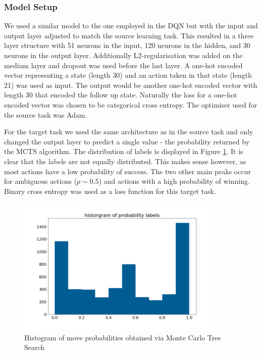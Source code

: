 \documentclass[12pt,a4paper]{article}
\begin{document}
{\subsubsection{Model Setup}
We used a similar model to the one employed in the DQN but with the input and output layer adjusted to match the source learning task. This resulted in a three layer structure with 51 neurons in the input, 120 neurons in the hidden, and 30 neurons in the output layer. Additionally L2-regularisation was added on the medium layer and dropout was used before the last layer. A one-hot encoded vector representing a state (length 30) and an action taken in that state (length 21) was used as input. The output would be another one-hot encoded vector with length 30 that encoded the follow up state. Naturally the loss for a one-hot encoded vector was chosen to be categorical cross entropy. The optimiser used for the source task was Adam.

For the target task we used the same architecture as in the source task and only changed the output layer to predict a single value - the probability returned by the MCTS algorithm. The distribution of labels is displayed in Figure \ref{fig:hist_labels}. It is clear that the labels are not equally distributed. This makes sense however, as most actions have a low probability of success. The two other main peaks occur for ambiguous actions ($p \sim 0.5$) and actions with a high probability of winning. Binary cross entropy was used as a loss function for this target task.

\begin{figure}
  \includegraphics[width=10cm]{img/hist_labels.png}
  \centering 
  \caption{Histogram of move probabilities obtained via Monte Carlo Tree Search}
  \label{fig:hist_labels}
\end{figure}

}
\end{document}
